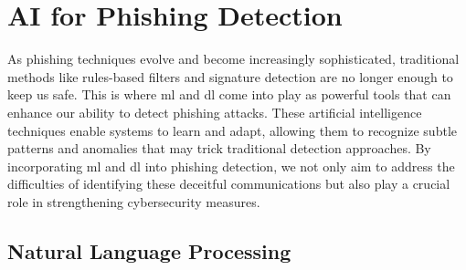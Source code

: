 \begin{comment}
The first step is to understand why people fall for phishing. Something in phishing emails lures the victims into clicking on some malicious link or providing confidential information.~\citet{butavicius2022people} performed a study where the objective was to understand why that happens. For that, they conducted an online experiment, and participants underwent an email classification task designed to examine susceptibility to phishing. In the study's discussion, it was mentioned that participants phishing email detection skills were poor. They correctly identified phishing only 42\% of the time and incorrectly flagged emails that were legitimate 31\% of the time. Despite the emails having leakage cues such as poor grammar, spelling, and punctuation the majority still fell for the attack and clicked the fake malicious link provided. 
\end{comment}



\section{AI for Phishing Detection}


As phishing techniques evolve and become increasingly sophisticated, traditional methods like rules-based filters and signature detection are no longer enough to keep us safe. This is where \ac{ml} and \ac{dl} come into play as powerful tools that can enhance our ability to detect phishing attacks. These artificial intelligence techniques enable systems to learn and adapt, allowing them to recognize subtle patterns and anomalies that may trick traditional detection approaches.
By incorporating \ac{ml} and \ac{dl} into phishing detection, we not only aim to address the difficulties of identifying these deceitful communications but also play a crucial role in strengthening cybersecurity measures.

\subsection{Natural Language Processing}

